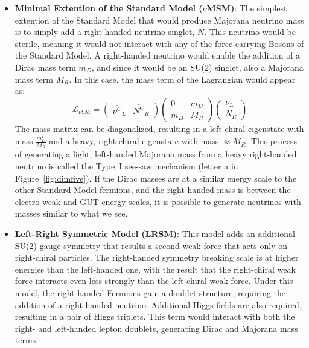 \documentclass[/main.tex]{subfiles}
\begin{document}
\begin{itemize}
\item \textbf{Minimal Extention of the Standard Model ($\nu$MSM)}: The simplest extention of the Standard Model that would produce Majorana neutrino mass is to simply add a right-handed neutrino singlet, $N$.
  This neutrino would be sterile, meaning it would not interact with any of the force carrying Bosons of the Standard Model.
  A right-handed neutrino would enable the addition of a Dirac mass term $m_D$, and since it would be an SU(2) singlet, also a Majorana mass term $M_R$.
  In this case, the mass term of the Lagrangian would appear as:
  \begin{equation}
    \mathcal{L_{\nu\mathrm{SM}}} = \begin{pmatrix} \bar{\nu^C}_L & \bar{N^C}_R \end{pmatrix} \begin{pmatrix} 0 & m_D \\ m_D & M_R \end{pmatrix} \begin{pmatrix} \nu_L \\ N_R \end{pmatrix}
  \end{equation}
  The mass matrix can be diagonalized, resulting in a left-chiral eigenstate with mass $\frac{m_D^2}{M_R}$ and a heavy, right-chiral eigenstate with mass $\approx M_R$.
  This process of generating a light, left-handed Majorana mass from a heavy right-handed neutrino is called the Type~I see-saw mechanism (letter a in Figure~\ref{fig:dimfive}).
  If the Dirac masses are at a similar energy scale to the other Standard Model fermions, and the right-handed mass is between the electro-weak and GUT energy scales, it is possible to generate neutrinos with masses similar to what we see.
\item \textbf{Left-Right Symmetric Model (LRSM)}: This model adds an additional SU(2) gauge symmetry that results a second weak force that acts only on right-chiral particles.
  The right-handed symmetry breaking scale is at higher energies than the left-handed one, with the result that the right-chiral weak force interacts even less strongly than the left-chiral weak force.
  Under this model, the right-handed Fermions gain a doublet structure, requiring the addition of a right-handed neutrino.
  Additional Higgs fields are also required, resulting in a pair of Higgs triplets.
  This term would interact with both the right- and left-handed lepton doublets, generating Dirac and Majorana mass terms.

\end{itemize}
\end{document}
